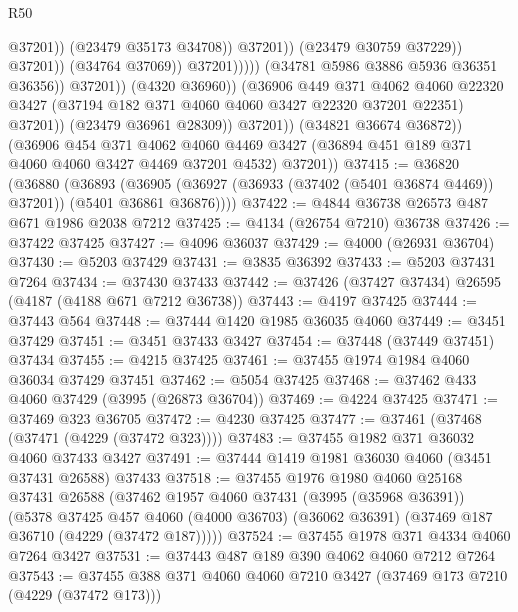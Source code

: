 \begin{lexlean}{R50}
\begin{coremodule}
                                                    @37201))
                                                (@23479 @35173 @34708))
                                              @37201))
                                          (@23479 @30759 @37229))
                                        @37201))
                                    (@34764 @37069))
                                  @37201)))))
                        (@34781 @5986 @3886 @5936 @36351 @36356))
                      @37201))
                  (@4320 @36960))
                (@36906
                  @449
                  @371
                  @4062
                  @4060
                  @22320
                  @3427
                  (@37194 @182 @371 @4060 @4060 @3427 @22320 @37201 @22351)
                  @37201))
              (@23479 @36961 @28309))
            @37201))
        (@34821 @36674 @36872))
      (@36906
        @454
        @371
        @4062
        @4060
        @4469
        @3427
        (@36894 @451 @189 @371 @4060 @4060 @3427 @4469 @37201 @4532)
        @37201))
@37415 := @36820
    (@36880
      (@36893
        (@36905 (@36927 (@36933 (@37402 (@5401 @36874 @4469)) @37201)) (@5401 @36861 @36876))))
@37422 := @4844 @36738 @26573 @487 @671 @1986 @2038 @7212
@37425 := @4134 (@26754 @7210) @36738
@37426 := @37422 @37425
@37427 := @4096 @36037
@37429 := @4000 (@26931 @36704)
@37430 := @5203 @37429
@37431 := @3835 @36392
@37433 := @5203 @37431 @7264
@37434 := @37430 @37433
@37442 := @37426 (@37427 @37434) @26595 (@4187 (@4188 @671 @7212 @36738))
@37443 := @4197 @37425
@37444 := @37443 @564
@37448 := @37444 @1420 @1985 @36035 @4060
@37449 := @3451 @37429
@37451 := @3451 @37433 @3427
@37454 := @37448 (@37449 @37451) @37434
@37455 := @4215 @37425
@37461 := @37455 @1974 @1984 @4060 @36034 @37429 @37451
@37462 := @5054 @37425
@37468 := @37462 @433 @4060 @37429 (@3995 (@26873 @36704))
@37469 := @4224 @37425
@37471 := @37469 @323 @36705
@37472 := @4230 @37425
@37477 := @37461 (@37468 (@37471 (@4229 (@37472 @323))))
@37483 := @37455 @1982 @371 @36032 @4060 @37433 @3427
@37491 := @37444 @1419 @1981 @36030 @4060 (@3451 @37431 @26588) @37433
@37518 := @37455
    @1976
    @1980
    @4060
    @25168
    @37431
    @26588
    (@37462
      @1957
      @4060
      @37431
      (@3995 (@35968 @36391))
      (@5378
        @37425
        @457
        @4060
        (@4000 @36703)
        (@36062 @36391)
        (@37469 @187 @36710 (@4229 (@37472 @187)))))
@37524 := @37455 @1978 @371 @4334 @4060 @7264 @3427
@37531 := @37443 @487 @189 @390 @4062 @4060 @7212 @7264
@37543 := @37455 @388 @371 @4060 @4060 @7210 @3427 (@37469 @173 @7210 (@4229 (@37472 @173)))

\end{coremodule}
\end{lexlean}
